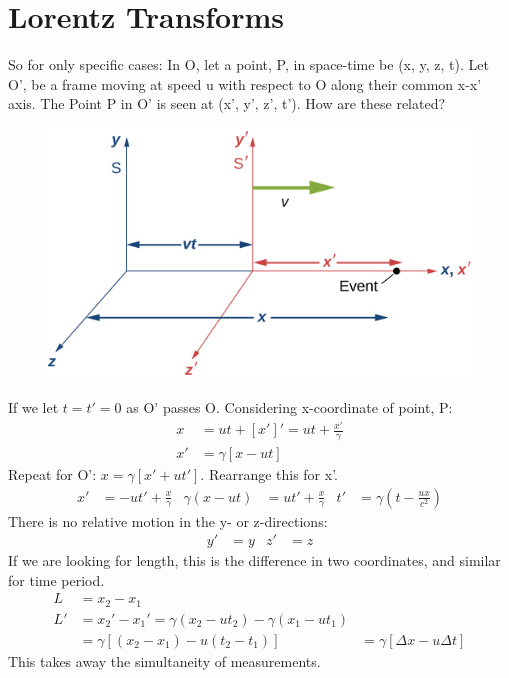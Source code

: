 \documentclass[a4paper, 11pt, normalem]{report}
\begin{document}
\section{Lorentz Transforms}
So for only specific cases:
In O, let a point, P, in space-time be (x, y, z, t).
Let O', be a frame moving at speed u with respect to O along their common x-x' axis.
The Point P in O' is seen at (x', y', z', t').
How are these related?
\begin{figure}[H]
    \centering
    \includegraphics{Axes.jpg}
\end{figure}
If we let $t = t' = 0$ as O' passes O.
Considering x-coordinate of point, P:
\begin{align}
    x &= ut + [x']' = ut + \frac{x'}{\gamma} \\
    x' &= \gamma [x - ut]
\end{align}
Repeat for O': $x = \gamma [x' + ut']$.
Rearrange this for x'.
\begin{align}
    x' &= -ut' + \frac{x}{\gamma} & \gamma(x - ut) &= ut' + \frac{x}{\gamma} & t' &= \gamma(t - \frac{ux}{c^{2}})
\end{align}
There is no relative motion in the y- or z-directions:
\begin{align}
    y' &= y & z' &= z
\end{align}
If we are looking for length, this is the difference in two coordinates, and similar for time period.
\begin{align}
    L &= x_{2} - x_{1} \\
    L' &= x_{2}' - x_{1}' = \gamma(x_{2} - ut_{2}) - \gamma(x_{1} - ut_{1}) \\
       &= \gamma[(x_{2} - x_{1}) - u(t_{2} - t_{1})] &= \gamma[\Delta x - u\Delta t]
\end{align}
This takes away the simultaneity of measurements.
\end{document}
